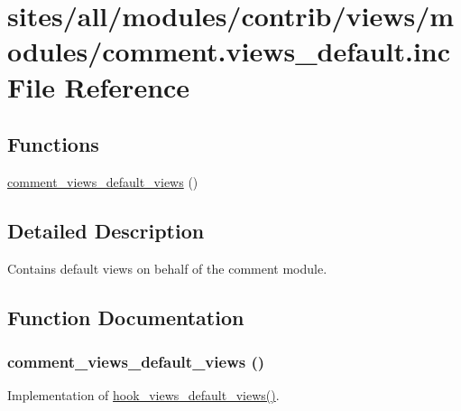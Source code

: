 \hypertarget{comment_8views__default_8inc}{
\section{sites/all/modules/contrib/views/modules/comment.views\_\-default.inc File Reference}
\label{comment_8views__default_8inc}
}
\subsection*{Functions}
\begin{CompactItemize}
\item 
\hyperlink{comment_8views__default_8inc_c97518afe3b53c9d547af9c49733a229}{comment\_\-views\_\-default\_\-views} ()
\end{CompactItemize}


\subsection{Detailed Description}
Contains default views on behalf of the comment module. 

\subsection{Function Documentation}
\hypertarget{comment_8views__default_8inc_c97518afe3b53c9d547af9c49733a229}{
\subsubsection[{comment\_\-views\_\-default\_\-views}]{\setlength{\rightskip}{0pt plus 5cm}comment\_\-views\_\-default\_\-views ()}}
\label{comment_8views__default_8inc_c97518afe3b53c9d547af9c49733a229}


Implementation of \hyperlink{group__views__hooks_g23edb74860682fa88f75cf94b97c2e15}{hook\_\-views\_\-default\_\-views()}. 